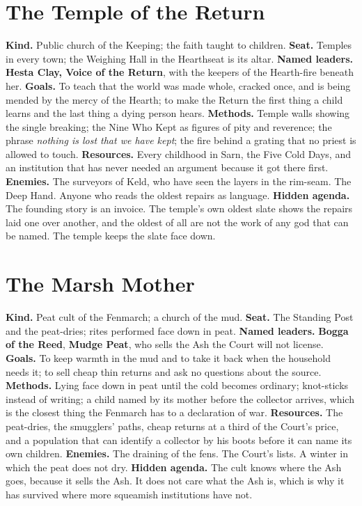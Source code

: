 \documentclass{design/chronicle}
\begin{document}
\section*{The Temple of the Return}

\textbf{Kind.} Public church of the Keeping; the faith taught to children. \textbf{Seat.} Temples in every town; the Weighing Hall in the Hearthseat is its altar. \textbf{Named leaders.} \textbf{Hesta Clay, Voice of the Return}, with the keepers of the Hearth-fire beneath her. \textbf{Goals.} To teach that the world was made whole, cracked once, and is being mended by the mercy of the Hearth; to make the Return the first thing a child learns and the last thing a dying person hears. \textbf{Methods.} Temple walls showing the single breaking; the Nine Who Kept as figures of pity and reverence; the phrase \emph{nothing is lost that we have kept}; the fire behind a grating that no priest is allowed to touch. \textbf{Resources.} Every childhood in Sarn, the Five Cold Days, and an institution that has never needed an argument because it got there first. \textbf{Enemies.} The surveyors of Keld, who have seen the layers in the rim-seam. The Deep Hand. Anyone who reads the oldest repairs as language. \textbf{Hidden agenda.} The founding story is an invoice. The temple’s own oldest slate shows the repairs laid one over another, and the oldest of all are not the work of any god that can be named. The temple keeps the slate face down.

\section*{The Marsh Mother}

\textbf{Kind.} Peat cult of the Fenmarch; a church of the mud. \textbf{Seat.} The Standing Post and the peat-dries; rites performed face down in peat. \textbf{Named leaders.} \textbf{Bogga of the Reed}, \textbf{Mudge Peat}, who sells the Ash the Court will not license. \textbf{Goals.} To keep warmth in the mud and to take it back when the household needs it; to sell cheap thin returns and ask no questions about the source. \textbf{Methods.} Lying face down in peat until the cold becomes ordinary; knot-sticks instead of writing; a child named by its mother before the collector arrives, which is the closest thing the Fenmarch has to a declaration of war. \textbf{Resources.} The peat-dries, the smugglers’ paths, cheap returns at a third of the Court’s price, and a population that can identify a collector by his boots before it can name its own children. \textbf{Enemies.} The draining of the fens. The Court’s lists. A winter in which the peat does not dry. \textbf{Hidden agenda.} The cult knows where the Ash goes, because it sells the Ash. It does not care what the Ash is, which is why it has survived where more squeamish institutions have not.
\end{document}
